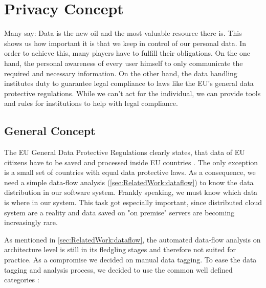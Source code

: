 
\chapter{Privacy Concept}
\label{ch:PrivacyConcept}

Many say: Data is the new oil and the most valuable resource there is. This shows us how important it is that we keep in control of our personal data. In order to achieve this, many players have to fulfill their obligations. On the one hand, the personal awareness of every user himself to only communicate the required and necessary information. On the other hand, the data handling institutes duty to guarantee legal compliance to laws like the EU’s general data protective regulations. While we can't act for the individual, we can provide tools and rules for institutions to help with legal compliance.

\section{General Concept}
\label{sec:PrivacyConcept:general}

The EU General Data Protective Regulations clearly states, that data of EU citizens have to be saved and processed inside EU countries \cite{personaldata.2011}. The only exception is a small set of countries with equal data protective laws. As a consequence, we need a simple data-flow analysis (\autoref{sec:RelatedWork:dataflow}) to know the data distribution in our software system. Frankly speaking, we must know which data is where in our system. This task got especially important, since distributed cloud system are a reality and data saved on "on premise" servers are becoming increasingly rare.

As mentioned in \autoref{sec:RelatedWork:dataflow}, the automated data-flow analysis on architecture level is still in its fledgling stages and therefore not suited for practice. As a compromise we decided on manual data tagging. To ease the data tagging and analysis process, we decided to use the common well defined categories \cite{Schmieders.2015}:

